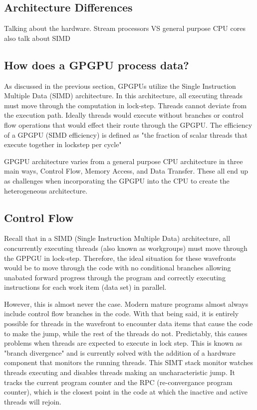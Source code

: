 \subsection*{Architecture Differences}

Talking about the hardware. Stream processors VS general purpose CPU cores also talk about SIMD

\subsection*{How does a GPGPU process data?}

As discussed in the previous section, GPGPUs utilize the Single Instruction Multiple Data (SIMD) architecture. In this architecture, all executing threads must move through the computation in lock-step. Threads cannot deviate from the execution path. Ideally threads would execute without branches or control flow operations that would effect their route through the GPGPU. The efficiency of a GPGPU (SIMD efficiency) is defined as "the fraction of scalar threads that execute together in lockstep per cycle" \cite{memcached}

GPGPU architecture varies from a general purpose CPU architecture in three main ways, Control Flow, Memory Access, and Data Transfer. These all end up as challenges when incorporating the GPGPU into the CPU to create the heterogeneous architecture. 

\subsection*{Control Flow}

Recall that in a SIMD (Single Instruction Multiple Data) architecture, all concurrently executing threads (also known as workgroups) must move through the GPPGU in lock-step. Therefore, the ideal situation for these wavefronts would be to move through the code with no conditional branches allowing unabated forward progress through the program and correctly executing instructions for each work item (data set) in parallel. 

However, this is almost never the case. Modern mature programs almost always include control flow branches in the code. With that being said, it is entirely possible for threads in the wavefront to encounter data items that cause the code to make the jump, while the rest of the threads do not. Predictably, this causes problems when threads are expected to execute in lock step. This is known as "branch divergence" and is currently solved with the addition of a hardware component that monitors the running threads. This SIMT stack monitor watches threads executing and disables threads making an uncharacteristic jump. It tracks the current program counter and the RPC (re-convergance program counter), which is the closest point in the code at which the inactive and active threads will rejoin. 

